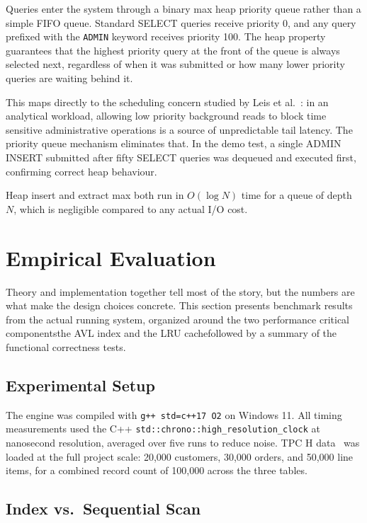 \documentclass[conference]{IEEEtran}
\newcommand{\code}[1]{\texttt{#1}}
\begin{document}
Queries enter the system through a binary max heap priority queue rather than a
simple FIFO queue. Standard SELECT queries receive priority 0, and any query
prefixed with the \code{ADMIN} keyword receives priority 100. The heap property
guarantees that the highest priority query at the front of the queue is always
selected next, regardless of when it was submitted or how many lower priority
queries are waiting behind it.

This maps directly to the scheduling concern studied by Leis et
al.~\cite{leis2023}: in an analytical workload, allowing low priority background
reads to block time sensitive administrative operations is a source of
unpredictable tail latency. The priority queue mechanism eliminates that. In the
demo test, a single ADMIN INSERT submitted after fifty SELECT queries was
dequeued and executed first, confirming correct heap behaviour.

Heap insert and extract max both run in $O(\log N)$ time for a queue of depth
$N$, which is negligible compared to any actual I/O cost.

\section{Empirical Evaluation}
\label{sec:eval}

Theory and implementation together tell most of the story, but the numbers are
what make the design choices concrete. This section presents benchmark results
from the actual running system, organized around the two performance critical
componentsthe AVL index and the LRU cachefollowed by a summary of the
functional correctness tests.

\subsection{Experimental Setup}

The engine was compiled with \code{g++  std=c++17  O2} on Windows 11. All
timing measurements used the C++ \code{std::chrono::high\_resolution\_clock} at
nanosecond resolution, averaged over five runs to reduce noise. TPC H
data~\cite{tpch2023} was loaded at the full project scale: 20,000 customers,
30,000 orders, and 50,000 line items, for a combined record count of 100,000
across the three tables.

\subsection{Index vs.\ Sequential Scan}
\end{document}
